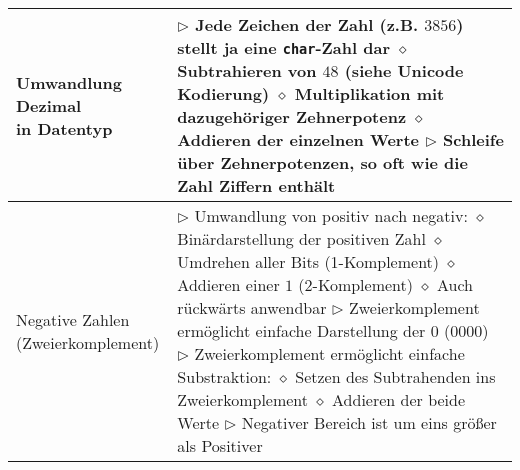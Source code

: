 \begin{longtable}{ | p{} p{} | }
	\makecell[l]{Umwandlung Dezimal \\ in Datentyp} & \makecell[l]{
	$\rhd$ Jede Zeichen der Zahl (z.B. $3856$) stellt ja eine \texttt{char}-Zahl dar \\
	\hspace{0.4cm} $\diamond$ Subtrahieren von $48$ (siehe Unicode Kodierung) \\
	\hspace{0.4cm} $\diamond$ Multiplikation mit dazugehöriger Zehnerpotenz \\
	\hspace{0.4cm} $\diamond$ Addieren der einzelnen Werte \\
	$\rhd$ Schleife über Zehnerpotenzen, so oft wie die Zahl Ziffern enthält} \\ \hline

	\makecell[l]{Negative Zahlen \\ (Zweierkomplement)} & \makecell[l]{
	$\rhd$ Umwandlung von positiv nach negativ: \\
	\hspace{0.4cm} $\diamond$ Binärdarstellung der positiven Zahl \\
	\hspace{0.4cm} $\diamond$ Umdrehen aller Bits (1-Komplement) \\
	\hspace{0.4cm} $\diamond$ Addieren einer $1$ (2-Komplement) \\
	\hspace{0.4cm} $\diamond$ Auch rückwärts anwendbar \\
	$\rhd$ Zweierkomplement ermöglicht einfache Darstellung der $0$ ($0000$) \\
	$\rhd$ Zweierkomplement ermöglicht einfache Substraktion: \\
	\hspace{0.4cm} $\diamond$ Setzen des Subtrahenden ins Zweierkomplement \\
	\hspace{0.4cm} $\diamond$ Addieren der beide Werte \\
	$\rhd$ Negativer Bereich ist um eins grö\ss er als Positiver} \\ \hline


\end{longtable}
